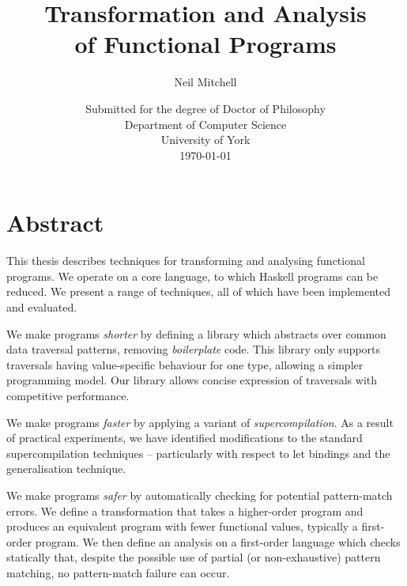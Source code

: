 
\title{Transformation and Analysis \\ of Functional Programs}
\author{Neil Mitchell}
\date{\normalsize{
    \vspace{20mm}
    Submitted for the degree of Doctor of Philosophy \\
    \vspace{10mm}
    Department of Computer Science \\
    University of York \\
    \today}}

\maketitle

\setcounter{page}{2}

\chapter*{Abstract}

This thesis describes techniques for transforming and analysing functional programs. We operate on a core language, to which Haskell programs can be reduced. We present a range of techniques, all of which have been implemented and evaluated.

We make programs \textit{shorter} by defining a library which abstracts over common data traversal patterns, removing \textit{boilerplate} code. This library only supports traversals having value-specific behaviour for one type, allowing a simpler programming model. Our library allows concise expression of traversals with competitive performance.

We make programs \textit{faster} by applying a variant of \textit{supercompilation}. As a result of practical experiments, we have identified modifications to the standard supercompilation techniques -- particularly with respect to let bindings and the generalisation technique.

We make programs \textit{safer} by automatically checking for potential pattern-match errors. We define a transformation that takes a higher-order program and produces an equivalent program with fewer functional values, typically a first-order program. We then define an analysis on a first-order language which checks statically that, despite the possible use of partial (or non-exhaustive) pattern matching, no pattern-match failure can occur.


\tableofcontents
\listoffigures
\listoftables

